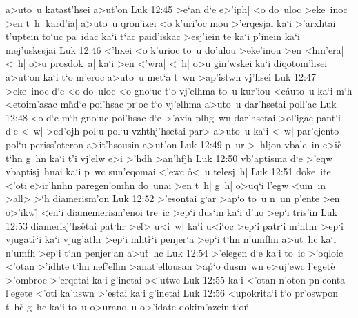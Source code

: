 a>uto~u
katast'hsei
a>ut'on\bibvsend
\vs Luk 12:45
>e`an
d`e
e>'iph|
<o
do~uloc
>eke~inoc
>en
t~h|
kard'ia|
a>uto~u
qron'izei
<o
k'uri'oc
mou
>'erqesjai
ka`i
>'arxhtai
t'uptein
to`uc
pa~idac
ka`i
t`ac
paid'iskac
>esj'iein
te
ka`i
p'inein
ka`i
mej'uskesjai\bibvsend
\vs Luk 12:46
<'hxei
<o
k'urioc
to~u
do'ulou
>eke'inou
>en
<hm'era|
<~h|
o>u
prosdok~a|
ka`i
>en
<'wra|
<~h|
o>u
gin'wskei
ka`i
diqotom'hsei
a>ut`on
ka`i
t`o
m'eroc
a>uto~u
met`a
t~wn
>ap'istwn
vj'hsei\bibvsend
\vs Luk 12:47
>eke~inoc
d`e
<o
do~uloc
<o
gno`uc
t`o
vj'elhma
to~u
kur'iou
<e\r{a}uto~u
ka`i
m`h
<etoim'asac
m\r{h}d`e
poi'hsac
pr`oc
t`o
vj'elhma
a>uto~u
dar'hsetai
poll'ac\bibvsend
\vs Luk 12:48
<o
d`e
m`h
gno`uc
poi'hsac
d`e
>'axia
plhg~wn
dar'hsetai
>ol'igac
pant`i
d`e
<~w|
>ed'ojh
pol`u
pol`u
vzhthj'hsetai
par>
a>uto~u
ka`i
<~w|
par'ejento
pol`u
periss'oteron
a>it'hsousin
a>ut'on\bibvsend
\vs Luk 12:49
p~ur
>~hljon
vbale~in
e>i\r{c}
t`hn
g~hn
ka`i
t'i
vj'elw
e>i
>'hdh
>an'hfjh\bibvsend
\vs Luk 12:50
vb'aptisma
d`e
>'eqw
vbaptisj~hnai
ka`i
p~wc
sun'eqomai
<'ewc
\r{o}<~u
telesj~h|\bibvsend
\vs Luk 12:51
doke~ite
<'oti
e>ir'hnhn
paregen'omhn
do~unai
>en
t~h|
g~h|
o>uq`i
l'egw
<um~in
>all>
>`h
diamerism'on\bibvsend
\vs Luk 12:52
>'esontai
g`ar
>ap`o
to~u
n~un
p'ente
>en
o>'ikw|\r{}
<en`i
diamemerism'enoi
tre~ic
>ep`i
dus`in
ka`i
d'uo
>ep`i
tris'in\bibvsend
\vs Luk 12:53
diamerisj'hs\r{e}tai
pat`hr
>e\r{f}>
u<i~w|
ka`i
u<i`oc
>ep`i
patr`i
m'hthr
>ep`i
vjugat\r{r}`i
ka`i
vjug'athr
>ep`i
mht\r{r}`i
penjer`a
>ep`i
t`hn
n'umfhn
a>ut~hc
ka`i
n'umfh
>ep`i
t`hn
penjer`an
a>u\r{t}~hc\bibvsend
{}
\vs Luk 12:54
>'elegen
d`e
ka`i
to~ic
>'oqloic
<'otan
>'idhte
t`hn
nef'elhn
>anat'ellousan
>a\r{p}`o
dusm~wn
e>uj'ewc
l'eget\r{e}
>'ombroc
>'erqetai
ka`i
g'inetai
o<'utwc\bibvsend
\vs Luk 12:55
ka`i
<'otan
n'oton
pn'eonta
l'egete
<'oti
ka'uswn
>'estai
ka`i
g'inetai\bibvsend
\vs Luk 12:56
<upokrita`i
t`o
pr'oswpon
t~hc\r{}
g~hc
ka`i
to~u
o>urano~u
o>'idate
dokim'azein
t`on\r{}
